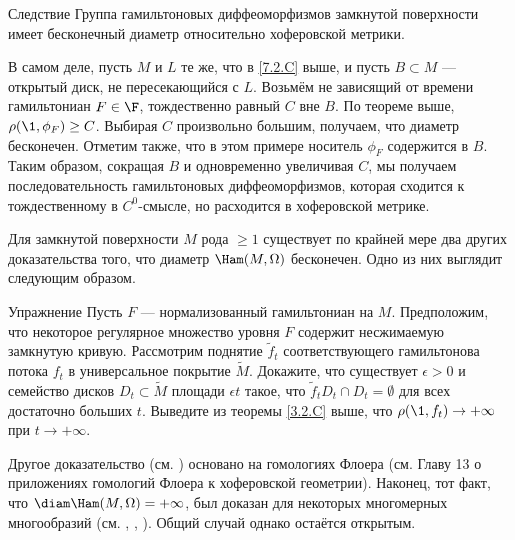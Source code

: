 \begin{thm}{Следствие}\label{7.2.D} Группа гамильтоновых диффеоморфизмов замкнутой поверхности имеет бесконечный диаметр относительно хоферовской метрики.
\end{thm}

В самом деле, пусть $M$ и $L$ те же, что в \ref{7.2.C} выше, и пусть $B \subset M$ --- открытый диск, не пересекающийся с $L$.
Возьмём не зависящий от времени гамильтониан $F \in \F$, тождественно равный $C$ вне $B$.
По теореме выше, $\rho (\1, \phi_F) \ge C$.
Выбирая $C$ произвольно большим, получаем, что диаметр бесконечен.
Отметим также, что в этом примере носитель $\phi_F$ содержится в $B$.
Таким образом, сокращая $B$ и одновременно увеличивая $C$, мы получаем последовательность гамильтоновых диффеоморфизмов, которая сходится к тождественному в $C^0$-смысле, но расходится в хоферовской метрике.

Для замкнутой поверхности $M$ рода $\ge 1$ существует по крайней мере два других доказательства того, что диаметр $\Ham (M, \Omega)$ бесконечен.
Одно из них выглядит следующим образом.

\begin{thm}[см. \cite{LM2}.]{Упражнение} \label{7.2.E}
Пусть $F$ --- нормализованный гамильтониан на $M$.
Предположим, что некоторое регулярное множество уровня $F$ содержит несжимаемую замкнутую кривую.
Рассмотрим поднятие $\tilde f_t$ соответствующего гамильтонова потока $f_t$ в универсальное покрытие $\tilde M$.
Докажите, что существует $\epsilon> 0$ и семейство дисков $D_t \subset \tilde M$ площади $\epsilon t$ такое, что $\tilde f_t D_t \cap D_t = \emptyset$ для всех достаточно больших $t$.
Выведите из теоремы \ref{3.2.C} выше, что $\rho (\1, f_t) \to + \infty$ при $t \to + \infty$.
\end{thm}

Другое доказательство (см. \cite{Sch3}) основано на гомологиях Флоера (см. Главу 13 о приложениях гомологий Флоера к хоферовской геометрии).
Наконец, тот факт, что $\diam \Ham (M, \Omega) = + \infty$, был доказан для некоторых многомерных многообразий (см. \cite{LM2}, \cite{Sch3}, \cite{P5}).
Общий случай однако остаётся открытым.
